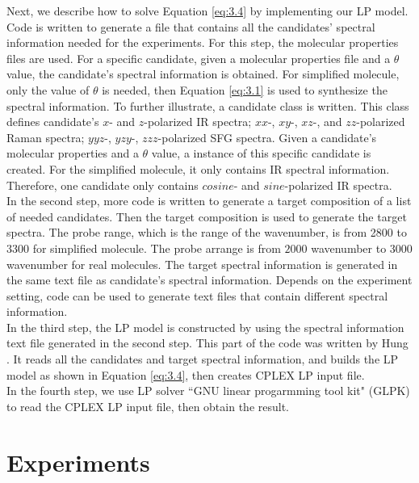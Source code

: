 Next, we describe how to solve Equation \ref{eq:3.4} by implementing our LP model. Code is written to generate a file that contains all the candidates' spectral information needed for the experiments. For this step, the molecular properties files are used. For a specific candidate, given a molecular properties file and a $\theta$ value, the candidate's spectral information is obtained. For simplified molecule, only the value of $\theta$ is needed, then Equation \ref{eq:3.1} is used to synthesize the spectral information. To further illustrate, a candidate class is written. This class defines candidate's $x$- and $z$-polarized IR spectra; $xx$-, $xy$-, $xz$-, and $zz$-polarized Raman spectra; $yyz$-, $yzy$-, $zzz$-polarized SFG spectra. Given a candidate's molecular properties and a $\theta$ value, a instance of this specific candidate is created. For the simplified molecule, it only contains IR spectral information. Therefore, one candidate only contains $cosine$- and $sine$-polarized IR spectra. \\

In the second step, more code is written to generate a target composition of a list of needed candidates. Then the target composition is used to generate the target spectra. The probe range, which is the range of the wavenumber, is from 2800 to 3300 for simplified molecule. The probe arrange is from $2000$ wavenumber to $3000$ wavenumber for real molecules. The target spectral information is generated in the same text file as candidate's spectral information. Depends on the experiment setting, code can be used to generate text files that contain different spectral information. \\

In the third step, the LP model is constructed by using the spectral information text file generated in the second step. This part of the code was written by Hung \cite{KuoKaiHung:Thesis:2015}. It reads all the candidates and target spectral information, and builds the LP model as shown in Equation \ref{eq:3.4}, then creates CPLEX LP input file. \\

In the fourth step, we use LP solver ``GNU linear progarmming tool kit" (GLPK) to read the CPLEX LP input file, then obtain the result. \\

\section{Experiments}

